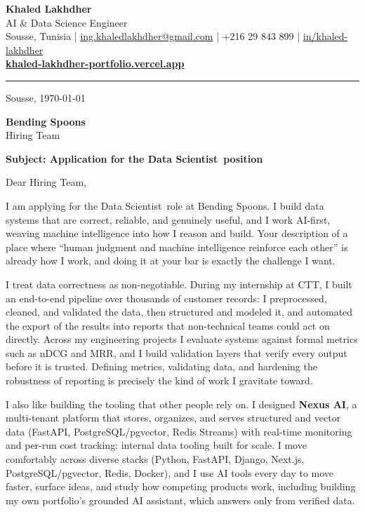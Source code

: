 \documentclass[11pt,a4paper]{article}
\newcommand{\Role}{Data Scientist}   %
\begin{document}
\begin{center}
  {\LARGE\bfseries\color{accent} Khaled Lakhdher}\\[2pt]
  {\large\color{muted} AI \& Data Science Engineer}\\[4pt]
  {\small\color{muted}
    Sousse, Tunisia \quad|\quad
    \href{mailto:ing.khaledlakhdher@gmail.com}{ing.khaledlakhdher@gmail.com} \quad|\quad
    +216 29 843 899 \quad|\quad
    \href{https://www.linkedin.com/in/khaled-lakhdher}{in/khaled-lakhdher}
  }\\[2pt]
  {\small\href{https://khaled-lakhdher-portfolio.vercel.app}{\textbf{\color{accent}khaled-lakhdher-portfolio.vercel.app}}}
\end{center}

\vspace{4pt}
{\color{muted!40}\hrule}
\vspace{10pt}

\hfill Sousse, \today

\textbf{Bending Spoons}\\
Hiring Team

\vspace{4pt}
\textbf{Subject: Application for the \Role\ position}

\vspace{6pt}
Dear Hiring Team,

I am applying for the \Role\ role at Bending Spoons. I build data systems that are correct, reliable, and genuinely useful, and I work AI-first, weaving machine intelligence into how I reason and build. Your description of a place where ``human judgment and machine intelligence reinforce each other'' is already how I work, and doing it at your bar is exactly the challenge I want.

I treat data correctness as non-negotiable. During my internship at CTT, I built an end-to-end pipeline over thousands of customer records: I preprocessed, cleaned, and validated the data, then structured and modeled it, and automated the export of the results into reports that non-technical teams could act on directly. Across my engineering projects I evaluate systems against formal metrics such as nDCG and MRR, and I build validation layers that verify every output before it is trusted. Defining metrics, validating data, and hardening the robustness of reporting is precisely the kind of work I gravitate toward.

I also like building the tooling that other people rely on. I designed \textbf{Nexus AI}, a multi-tenant platform that stores, organizes, and serves structured and vector data (FastAPI, PostgreSQL/pgvector, Redis Streams) with real-time monitoring and per-run cost tracking: internal data tooling built for scale. I move comfortably across diverse stacks (Python, FastAPI, Django, Next.js, PostgreSQL/pgvector, Redis, Docker), and I use AI tools every day to move faster, surface ideas, and study how competing products work, including building my own portfolio's grounded AI assistant, which answers only from verified data.
\end{document}
